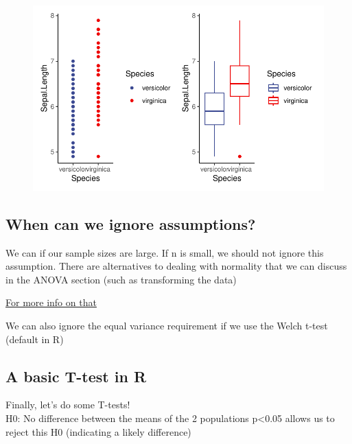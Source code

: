 \documentclass[
  letterpaper,
  DIV=11,
  numbers=noendperiod]{scrartcl}
\begin{document}
\begin{figure}[H]

{\centering \includegraphics{cor_reg_chi_files/figure-pdf/unnamed-chunk-32-1.pdf}

}

\end{figure}

\subsection{\texorpdfstring{\textbf{When can we ignore
assumptions?}}{When can we ignore assumptions?}}

We can if our sample sizes are large. If n is small, we should not
ignore this assumption. There are alternatives to dealing with normality
that we can discuss in the ANOVA section (such as transforming the data)

\href{https://thestatsgeek.com/2013/09/28/the-t-test-and-robustness-to-non-normality/}{For
more info on that}

We can also ignore the equal variance requirement if we use the Welch
t-test (default in R)\\

\subsection{\texorpdfstring{\textbf{A basic T-test in
R}}{A basic T-test in R}}

Finally, let's do some T-tests!\\

H0: No difference between the means of the 2 populations p\textless0.05
allows us to reject this H0 (indicating a likely difference)
\end{document}
